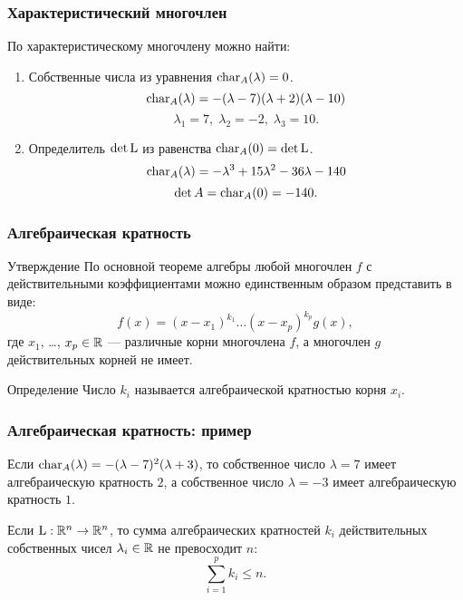  \begin{frame}
     \frametitle{Характеристический многочлен}

     По характеристическому многочлену можно найти: \pause

     \begin{enumerate}
         \item Собственные числа из уравнения $\operatorname{char}_{A}(\lambda) = 0$.
         \[
            \operatorname{char}_{A}(\lambda)  = -(\lambda - 7)(\lambda + 2)(\lambda - 10)    
         \]
         \[
         \lambda_1 = 7, \; \lambda_2 = -2, \; \lambda_3 = 10.    
         \]
         
         \pause
         \item Определитель $\det \operatorname{L}$ из равенства $\operatorname{char}_{A}(0) = \det \operatorname{L}$.
         \[
            \operatorname{char}_{A}(\lambda) =-\lambda^3  + 15\lambda^2   -36 \lambda  - 140 
         \]
         \[
         \det A = \operatorname{char}_A(0)=-140.
         \]

     \end{enumerate}
 
 
 \end{frame}


 \begin{frame}
     \frametitle{Алгебраическая кратность}

     \begin{block}{Утверждение}
    По основной теореме алгебры любой многочлен $f$ с действительными коэффициентами можно единственным образом представить в виде:
    \[
    f(x) = (x-x_1)^{k_1}\ldots (x-x_p)^{k_p} g(x),
    \]
    где $x_1$, \ldots, $x_p \in \mathbb{R}$ — различные корни многочлена $f$, а многочлен $g$ действительных корней не имеет. 
         
     \end{block}
 
     \pause
     \begin{block}{Определение}
        Число $k_i$ называется \alert{алгебраической кратностью} корня $x_i$.
     \end{block}
 
 \end{frame}


 \begin{frame}
     \frametitle{Алгебраическая кратность: пример}

     Если $\operatorname{char}_A(\lambda) = -(\lambda - 7)^2(\lambda + 3)$, то 
     собственное число $\lambda = 7$ имеет алгебраическую кратность $2$, 
     а собственное число $\lambda = -3$ имеет алгебраическую кратность $1$.
 
     \pause
     Если $\operatorname{L} : \mathbb{R}^n \to \mathbb{R}^n$, то сумма алгебраических кратностей $k_i$ 
     действительных собственных чисел $\lambda_i \in \mathbb{R}$
     не превосходит $n$:
    \[
    \sum_{i=1}^p k_i \leq n.
    \]

 \end{frame}




